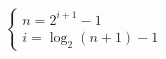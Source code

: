 \documentclass[preview]{standalone}
\begin{document}
\begin{align*}
\begin{cases} n = 2^{ i + 1} - 1 \\i = \log_2(n + 1) - 1\end{cases}
\end{align*}
\end{document}
